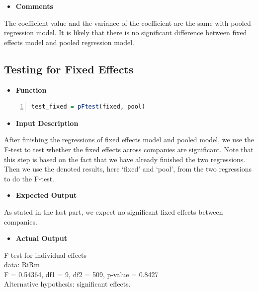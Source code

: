     \begin{itemize}
    \item \textbf{Comments}
    \end{itemize}
    \noindent The coefficient value and the variance of the coefficient are the same with pooled regression model. It is likely that there is no significant difference between fixed effects model and pooled regression model.\\


    \subsection{Testing for Fixed Effects}
    \begin{itemize}
    \item \textbf{Function}
    \end{itemize}
    \begin{lstlisting}[language=R,numbers=left, numberstyle=\normalsize]
test_fixed = pFtest(fixed, pool)
    \end{lstlisting}
    \begin{itemize}
    \item \textbf{Input Description}
    \end{itemize}
    \noindent After finishing the regressions of fixed effects model and pooled model, we use the F-test to test whether the fixed effects across companies are significant. Note that this step is based on the fact that we have already finished the two regressions. Then we use the denoted results, here `fixed' and `pool', from the two regressions to do the F-test.\\


    \begin{itemize}
    \item \textbf{Expected Output}
    \end{itemize}
    \noindent As stated in the last part, we expect no significant fixed effects between companies.\\

    \begin{itemize}
    \item \textbf{Actual Output}
    \end{itemize}
    F test for individual effects\\
    data:  Ri\~Rm\\
    F = 0.54364, df1 = 9, df2 = 509, p-value = 0.8427\\
    Alternative hypothesis: significant effects.\\

